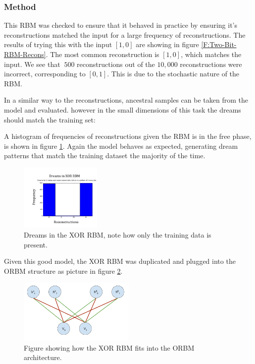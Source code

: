 \subsubsection{Method}

This RBM was checked to ensure that it behaved in practice by ensuring it's reconstructions matched the input for a large frequency of reconstructions. The results of trying this with the input $[1,0]$ are showing in figure \ref{F:Two-Bit-RBM-Recons}. The most common reconstruction is  $[1,0]$, which matches the input. We see that $~500$ reconstructions out of the $10,000$ reconstructions were incorrect, corresponding to $[0,1]$. This is due to the stochastic nature of the RBM.



In a similar way to the reconstructions, ancestral samples can be taken from the model and evaluated.  however in the small dimensions of this task the dreams should match the training set:

A histogram of frequencies of reconstructions given the RBM is in the free phase, is shown in figure \ref{F:Two-Bit-RBM-Dreams}. Again the model behaves as expected, generating dream patterns that match the training dataset the majority of the time.
\begin{figure}
  \begin{center}
    \includegraphics[width=0.35\textwidth]{Assets/XOR-RBM-Dreams.png}
  \end{center}
  \caption{Dreams in the XOR RBM, note how only the training data is present.}
  \label{F:Two-Bit-RBM-Dreams}
\end{figure}
Given this good model, the XOR RBM was duplicated and plugged into the ORBM structure as picture in figure \ref{F:XOR-ORBM}.


\begin{figure}
  \begin{center}
    \includegraphics[width=0.5\textwidth]{Assets/XOR-ORBM.png}
  \end{center}
  \caption{Figure showing how the XOR RBM fits into the ORBM architecture.}
  \label{F:XOR-ORBM}
\end{figure}

